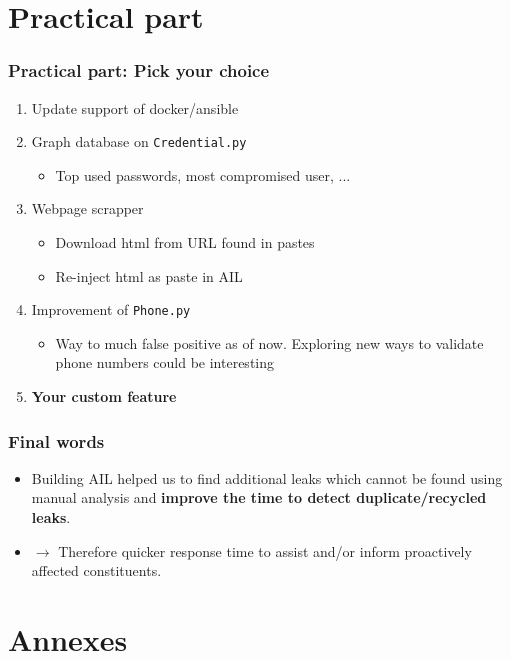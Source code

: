 \section{Practical part}
\begin{frame}
    \frametitle{Practical part: Pick your choice}

    \begin{enumerate}
        \item Update support of docker/ansible
        \item Graph database on \texttt{Credential.py}
        \begin{itemize}
            \item Top used passwords, most compromised user, ...
        \end{itemize}
        \item Webpage scrapper
        \begin{itemize}
            \item Download html from URL found in pastes
            \item Re-inject html as paste in AIL
        \end{itemize}
    \item Improvement of \texttt{Phone.py}
        \begin{itemize}
            \item Way to much false positive as of now. Exploring new ways to validate phone numbers could be interesting
        \end{itemize}

        \item \textbf{Your custom feature}
    \end{enumerate}
\end{frame}




\begin{frame}
   \frametitle{Final words}
   \begin{itemize}
        \item Building AIL helped us to find additional leaks which cannot be found using manual analysis and {\bf improve the time to detect duplicate/recycled leaks}.
            \vskip0.5cm
        \item[] $\rightarrow$ Therefore quicker response time to assist and/or inform proactively affected constituents.
   \end{itemize}
\end{frame}


\section{Annexes}
